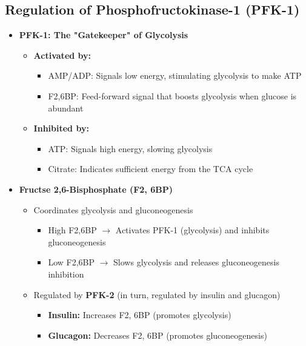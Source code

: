 \documentclass[10pt]{article}
\begin{document}
\subsection*{Regulation of Phosphofructokinase-1 (PFK-1)}
\begin{itemize}
	\item \textbf{PFK-1: The "Gatekeeper" of Glycolysis}
	\begin{itemize}
        \item \textbf{Activated by:}
        \begin{itemize}
            \item AMP/ADP: Signals low energy, stimulating glycolysis to make ATP
            \item F2,6BP: Feed-forward signal that boosts glycolysis when glucose is abundant
        \end{itemize}
        \item \textbf{Inhibited by:}
        \begin{itemize}
            \item ATP: Signals high energy, slowing glycolysis
            \item Citrate: Indicates sufficient energy from the TCA cycle
        \end{itemize}
    \end{itemize}
	\item \textbf{Fructse 2,6-Bisphosphate (F2, 6BP)}
	\begin{itemize}
        \item Coordinates glycolysis and gluconeogenesis
        \begin{itemize}
            \item High F2,6BP $\rightarrow$ Activates PFK-1 (glycolysis) and inhibits gluconeogenesis
            \item Low F2,6BP $\rightarrow$ Slows glycolysis and releases gluconeogenesis inhibition
        \end{itemize}
        \item Regulated by \textbf{PFK-2} (in turn, regulated by insulin and glucagon)
        \begin{itemize}
            \item \textbf{Insulin:} Increases F2, 6BP (promotes glycolysis)
            \item \textbf{Glucagon:} Decreases F2, 6BP (promotes gluconeogenesis)
        \end{itemize}
    \end{itemize}
\end{itemize}
\end{document}
